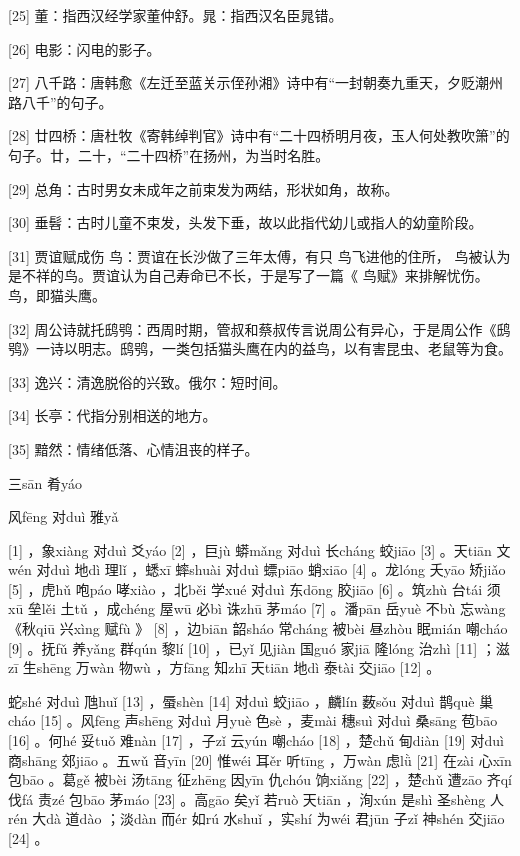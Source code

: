 \documentclass[12pt,UTF8]{ctexbook}
\begin{document}
[25] 董：指西汉经学家董仲舒。晁：指西汉名臣晁错。

[26] 电影：闪电的影子。

[27] 八千路：唐韩愈《左迁至蓝关示侄孙湘》诗中有“一封朝奏九重天，夕贬潮州路八千”的句子。

[28] 廿四桥：唐杜牧《寄韩绰判官》诗中有“二十四桥明月夜，玉人何处教吹箫”的句子。廿，二十，“二十四桥”在扬州，为当时名胜。

[29] 总角：古时男女未成年之前束发为两结，形状如角，故称。

[30] 垂髫：古时儿童不束发，头发下垂，故以此指代幼儿或指人的幼童阶段。

[31] 贾谊赋成伤 鸟：贾谊在长沙做了三年太傅，有只 鸟飞进他的住所， 鸟被认为是不祥的鸟。贾谊认为自己寿命已不长，于是写了一篇《 鸟赋》来排解忧伤。 鸟，即猫头鹰。

[32] 周公诗就托鸱鸮：西周时期，管叔和蔡叔传言说周公有异心，于是周公作《鸱鸮》一诗以明志。鸱鸮，一类包括猫头鹰在内的益鸟，以有害昆虫、老鼠等为食。

[33] 逸兴：清逸脱俗的兴致。俄尔：短时间。

[34] 长亭：代指分别相送的地方。

[35] 黯然：情绪低落、心情沮丧的样子。





三sān 肴yáo


风fēng 对duì 雅yǎ





[1] ，象xiàng 对duì 爻yáo [2] ，巨jù 蟒mǎng 对duì 长cháng 蛟jiāo [3] 。天tiān 文wén 对duì 地dì 理lǐ ，蟋xī 蟀shuài 对duì 螵piāo 蛸xiāo [4] 。龙lóng 夭yāo 矫jiǎo [5] ，虎hǔ 咆páo 哮xiào ，北běi 学xué 对duì 东dōng 胶jiāo [6] 。筑zhù 台tái 须xū 垒lěi 土tǔ ，成chéng 屋wū 必bì 诛zhū 茅máo [7] 。潘pān 岳yuè 不bù 忘wàng 《秋qiū 兴xìng 赋fù 》 [8] ，边biān 韶sháo 常cháng 被bèi 昼zhòu 眠mián 嘲cháo [9] 。抚fǔ 养yǎng 群qún 黎lí [10] ，已yǐ 见jiàn 国guó 家jiā 隆lóng 治zhì [11] ；滋zī 生shēng 万wàn 物wù ，方fāng 知zhī 天tiān 地dì 泰tài 交jiāo [12] 。

蛇shé 对duì 虺huǐ [13] ，蜃shèn [14] 对duì 蛟jiāo ，麟lín 薮sǒu 对duì 鹊què 巢cháo [15] 。风fēng 声shēng 对duì 月yuè 色sè ，麦mài 穗suì 对duì 桑sāng 苞bāo [16] 。何hé 妥tuǒ 难nàn [17] ，子zǐ 云yún 嘲cháo [18] ，楚chǔ 甸diàn [19] 对duì 商shāng 郊jiāo 。五wǔ 音yīn [20] 惟wéi 耳ěr 听tīng ，万wàn 虑lǜ [21] 在zài 心xīn 包bāo 。葛gě 被bèi 汤tāng 征zhēng 因yīn 仇chóu 饷xiǎng [22] ，楚chǔ 遭zāo 齐qí 伐fá 责zé 包bāo 茅máo [23] 。高gāo 矣yǐ 若ruò 天tiān ，洵xún 是shì 圣shèng 人rén 大dà 道dào ；淡dàn 而ér 如rú 水shuǐ ，实shí 为wéi 君jūn 子zǐ 神shén 交jiāo [24] 。
\end{document}
